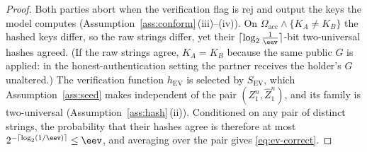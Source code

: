 \begin{proof}
Both parties abort when the verification flag is $\mathrm{rej}$ and output
the keys the model computes (Assumption~\ref{ass:conform}\,(iii)--(iv)). On
$\Omega_{\mathrm{acc}}\wedge\{K_A\ne K_B\}$ the hashed keys differ, so the
raw strings differ, yet their $\lceil\log_2\frac1{\eev}\rceil$-bit
two-universal hashes agreed. (If the raw strings agree, $K_A=K_B$ because
the same public $G$ is applied: in the honest-authentication setting the
partner receives the holder's $G$ unaltered.) The verification function
$h_{\mathrm{EV}}$ is selected by $S_{\mathrm{EV}}$, which
Assumption~\ref{ass:seed} makes independent of the pair
$(Z_1^n,\hat Z_1^n)$, and its family is two-universal
(Assumption~\ref{ass:hash}\,(ii)). Conditioned on any pair of distinct
strings, the probability that their hashes agree is therefore at most
$2^{-\lceil\log_2(1/\eev)\rceil}\le\eev$, and averaging over the pair gives
\eqref{eq:ev-correct}.
\end{proof}

